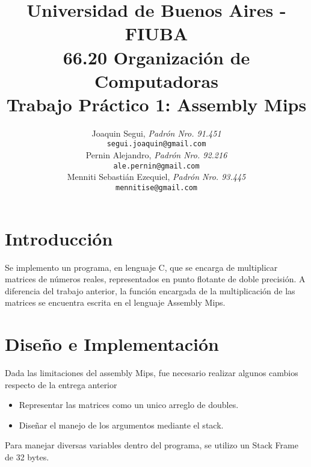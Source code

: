 \documentclass[10pt,a4paper]{article}
\title{Universidad de Buenos Aires - FIUBA \\
		66.20 Organización de Computadoras \\
		Trabajo Práctico 1: Assembly Mips\\}
\author{	Joaquin Segui, \textit{Padrón Nro. 91.451}                     \\
            \texttt{ segui.joaquin@gmail.com }                                          \\[2.5ex]
            Pernin Alejandro, \textit{Padrón Nro. 92.216}                     \\
            \texttt{ale.pernin@gmail.com}                                              \\[2.5ex]
            Menniti Sebastián Ezequiel, \textit{Padrón Nro. 93.445}                     \\
            \texttt{ mennitise@gmail.com }                                              \\[2.5ex]}
\date{}
\begin{document}
%


\maketitle\thispagestyle{empty}

\newpage\null\thispagestyle{empty}%



\section{Introducción}

Se implemento un programa, en lenguaje C, que se encarga de multiplicar matrices de números reales, representados en punto flotante de doble precisión. A diferencia del trabajo anterior, la función encargada de la multiplicación de las matrices se encuentra escrita en el lenguaje Assembly Mips.


\section{Diseño e Implementación}

Dada las limitaciones del assembly Mips, fue necesario realizar algunos cambios respecto de la entrega anterior

\begin{itemize}
	\item Representar las matrices como un unico arreglo de doubles.
	\item Diseñar el manejo de los argumentos mediante el stack.
\end{itemize}

Para manejar diversas variables dentro del programa, se utilizo un Stack Frame de 32 bytes.
\end{document}
